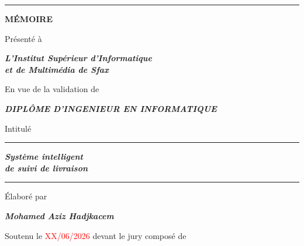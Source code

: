 \begin{titlepage}
\vspace{0.3cm}
\noindent\hspace*{\bandeoffset}\textcolor{isimsblue}{\rule{0.88\textwidth}{1.2pt}}

\vspace{1.1cm}

\noindent\hspace*{\bandeoffset}%
\begin{minipage}{0.88\textwidth}
\centering

  {\fontsize{30}{34}\selectfont\bfseries MÉMOIRE}

  \vspace{1.0cm}
  {\footnotesize Présenté à}

  \vspace{0.4cm}
  {\bfseries\itshape L'Institut Supérieur d'Informatique\\ et de Multimédia de Sfax}

  \vspace{0.9cm}
  {\footnotesize En vue de la validation de}

  \vspace{0.4cm}
  {\bfseries\itshape DIPLÔME D'INGENIEUR EN INFORMATIQUE}

  \vspace{0.9cm}
  {\footnotesize Intitulé}

  \vspace{0.4cm}
  \rule{0.76\linewidth}{1.2pt}

  \vspace{0.55cm}
  {\Large\bfseries\itshape Système intelligent\\[2pt] de suivi de livraison}

  \vspace{0.55cm}
  \rule{0.76\linewidth}{1.2pt}

  \vspace{1.1cm}
  {\footnotesize Élaboré par}

  \vspace{0.4cm}
  {\large\bfseries\itshape Mohamed Aziz Hadjkacem}

  \vspace{1.2cm}
  {\footnotesize Soutenu le \textcolor{red}{XX/06/2026} devant le jury composé de}


\end{minipage}
\end{titlepage}
